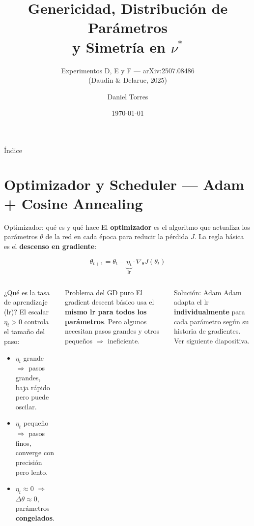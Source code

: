 \documentclass[10pt]{beamer}
\title[Experimentos D, E y F — Genericidad y Distribución de $\nu^*$]{%
  Genericidad, Distribución de Parámetros\\y Simetría en $\nu^*$}
\subtitle{Experimentos D, E y F — arXiv:2507.08486\\(Daudin \& Delarue, 2025)}
\author[Daniel Torres]{Daniel Torres}
\institute[CSIC]{Consejo Superior de Investigaciones Científicas (CSIC)\\
Beca de Introducción a la Investigación JAE\\
\medskip
{\small Tutor: Rafael Orive}}
\date{\today}
\begin{document}
\begin{frame}
  \titlepage
\end{frame}

\begin{frame}{Índice}
  \tableofcontents
\end{frame}

\section{Optimizador y Scheduler — Adam + Cosine Annealing}

\begin{frame}{Optimizador: qué es y qué hace}
\small
El \textbf{optimizador} es el algoritmo que actualiza los parámetros $\theta$ de la red en cada época para reducir la pérdida $J$. La regla básica es el \textbf{descenso en gradiente}:

\[
  \theta_{t+1} = \theta_t - \underbrace{\eta_t}_{\text{lr}} \cdot \nabla_\theta J(\theta_t)
\]

\begin{columns}
\begin{block}{¿Qué es la tasa de aprendizaje (lr)?}
  El escalar $\eta_t > 0$ controla el tamaño del paso:
  \begin{itemize}
    \item $\eta_t$ grande $\Rightarrow$ pasos grandes, baja rápido pero puede oscilar.
    \item $\eta_t$ pequeño $\Rightarrow$ pasos finos, converge con precisión pero lento.
    \item $\eta_t \approx 0$ $\Rightarrow$ $\Delta\theta \approx 0$, parámetros \textbf{congelados}.
  \end{itemize}
\end{block}

\begin{block}{Problema del GD puro}
  El gradient descent básico usa el \textbf{mismo lr para todos los parámetros}. Pero algunos necesitan pasos grandes y otros pequeños $\Rightarrow$ ineficiente.
\end{block}

\smallskip
\begin{alertblock}{Solución: Adam}
  Adam adapta el lr \textbf{individualmente} para cada parámetro según su historia de gradientes. Ver siguiente diapositiva.
\end{alertblock}
\end{columns}

\end{frame}
\end{document}
